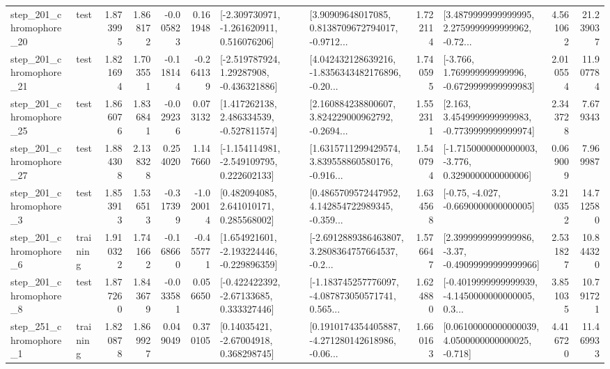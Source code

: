 \begin{tabular}{llrrrrllrlrr}
  step\_201\_chromophore\_20 &      test &      1.873995 &    1.868172 &     -0.005823 &  0.161948 &   [-2.309730971, -1.261620911, 0.516076206] &  [3.90909648017085, 0.8138709672794017, -0.9712... &       1.722114 &  [3.4879999999999995, 2.2759999999999962, -0.72... &            4.561062 &         21.239037 \\
  step\_201\_chromophore\_21 &      test &      1.821694 &    1.703551 &     -0.118144 & -0.264139 &    [-2.519787924, 1.29287908, -0.436321886] &  [4.042432128639216, -1.8356343482176896, -0.20... &       1.740595 &   [-3.766, 1.769999999999996, -0.6729999999999983] &            2.010554 &         11.907784 \\
  step\_201\_chromophore\_25 &      test &      1.866076 &    1.836841 &     -0.029236 &  0.073132 &    [1.417262138, 2.486334539, -0.527811574] &  [2.160884238800607, 3.824229000962792, -0.2694... &       1.552311 &   [2.163, 3.4549999999999983, -0.7739999999999974] &            2.343728 &          7.679343 \\
  step\_201\_chromophore\_27 &      test &      1.884308 &    2.138328 &      0.254020 &  1.147660 &   [-1.154114981, -2.549109795, 0.222602133] &  [1.6315711299429574, 3.839558860580176, -0.916... &       1.540794 &  [-1.7150000000000003, -3.776, 0.3290000000000006] &            0.069009 &          7.969987 \\
   step\_201\_chromophore\_3 &      test &      1.853913 &    1.536513 &     -0.317399 & -1.020014 &     [0.482094085, 2.641010171, 0.285568002] &  [0.4865709572447952, 4.142854722989345, -0.359... &       1.634568 &               [-0.75, -4.027, -0.6690000000000005] &            3.210352 &         14.712580 \\
   step\_201\_chromophore\_6 &  training &      1.910322 &    1.741662 &     -0.168660 & -0.455771 &   [1.654921601, -2.193224446, -0.229896359] &  [-2.6912889386463807, 3.2808364757664537, -0.2... &       1.576647 &  [2.3999999999999986, -3.37, -0.49099999999999966] &            2.531827 &         10.844320 \\
   step\_201\_chromophore\_8 &      test &      1.877260 &    1.843679 &     -0.033581 &  0.056650 &    [-0.422422392, -2.67133685, 0.333327446] &  [-1.183745257776097, -4.087873050571741, 0.565... &       1.624880 &  [-0.4019999999999939, -4.1450000000000005, 0.3... &            3.851035 &         10.791721 \\
   step\_251\_chromophore\_1 &  training &      1.820878 &    1.869927 &      0.049049 &  0.370105 &      [0.14035421, -2.67004918, 0.368298745] &  [0.1910174354405887, -4.271280142618986, -0.06... &       1.660163 &  [0.06100000000000039, 4.0500000000000025, -0.718] &            4.416720 &         11.469933 \\

\end{tabular}
